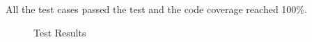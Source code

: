 All the test cases passed the test and the code coverage reached 100\%.

\begin{figure}[h!]
    \centering
    \caption{Test Results}
    \label{fig:Results and Coverage}
\end{figure}